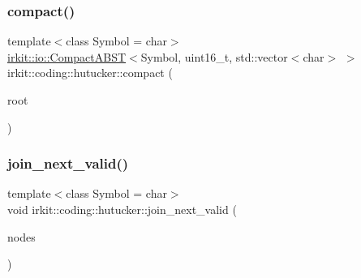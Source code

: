 \mbox{\label{namespaceirkit_1_1coding_1_1hutucker_a7c24cbbeaea86c42d88569db9c34321c}} 
\subsubsection{\texorpdfstring{compact()}{compact()}}
{\footnotesize\ttfamily template$<$class Symbol  = char$>$ \\
\mbox{\hyperlink{classirkit_1_1io_1_1CompactABST}{irkit\+::io\+::\+Compact\+A\+B\+ST}}$<$Symbol, uint16\+\_\+t, std\+::vector$<$char$>$ $>$ irkit\+::coding\+::hutucker\+::compact (\begin{DoxyParamCaption}\item[{\mbox{\hyperlink{namespaceirkit_1_1coding_1_1hutucker_a3fd5bcbd5c6d608f75e0afbb7f171899}{Node\+Ptr}}$<$ Symbol $>$}]{root }\end{DoxyParamCaption})}

\mbox{\label{namespaceirkit_1_1coding_1_1hutucker_a634a32e3cd6736a17e7e65c59af92f55}} 
\subsubsection{\texorpdfstring{join\+\_\+next\+\_\+valid()}{join\_next\_valid()}}
{\footnotesize\ttfamily template$<$class Symbol  = char$>$ \\
void irkit\+::coding\+::hutucker\+::join\+\_\+next\+\_\+valid (\begin{DoxyParamCaption}\item[{std\+::list$<$ \mbox{\hyperlink{namespaceirkit_1_1coding_1_1hutucker_a3fd5bcbd5c6d608f75e0afbb7f171899}{Node\+Ptr}}$<$ Symbol $>$$>$ \&}]{nodes }\end{DoxyParamCaption})}

\mbox{\label{namespaceirkit_1_1coding_1_1hutucker_abbc70e1f6cfcebe43ca85c70080c103f}} 
